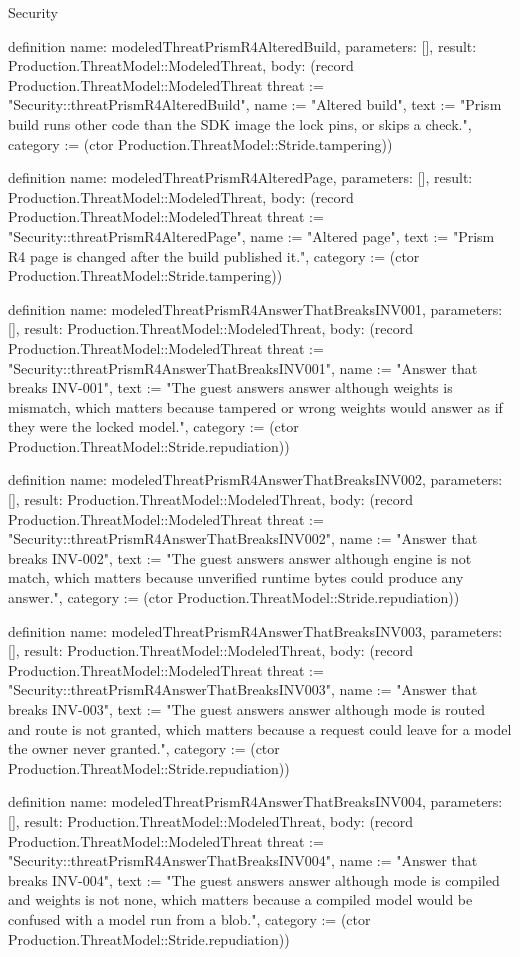 \begin{lexlean}{Security}
\begin{semanticmodule}
definition{
  name: modeledThreatPrismR4AlteredBuild,
  parameters: [],
  result: Production.ThreatModel::ModeledThreat,
  body: (record Production.ThreatModel::ModeledThreat {threat := "Security::threatPrismR4AlteredBuild", name := "Altered build", text := "Prism build runs other code than the SDK image the lock pins, or skips a check.", category := (ctor Production.ThreatModel::Stride.tampering)})
}

definition{
  name: modeledThreatPrismR4AlteredPage,
  parameters: [],
  result: Production.ThreatModel::ModeledThreat,
  body: (record Production.ThreatModel::ModeledThreat {threat := "Security::threatPrismR4AlteredPage", name := "Altered page", text := "Prism R4 page is changed after the build published it.", category := (ctor Production.ThreatModel::Stride.tampering)})
}

definition{
  name: modeledThreatPrismR4AnswerThatBreaksINV001,
  parameters: [],
  result: Production.ThreatModel::ModeledThreat,
  body: (record Production.ThreatModel::ModeledThreat {threat := "Security::threatPrismR4AnswerThatBreaksINV001", name := "Answer that breaks INV-001", text := "The guest answers answer although weights is mismatch, which matters because tampered or wrong weights would answer as if they were the locked model.", category := (ctor Production.ThreatModel::Stride.repudiation)})
}

definition{
  name: modeledThreatPrismR4AnswerThatBreaksINV002,
  parameters: [],
  result: Production.ThreatModel::ModeledThreat,
  body: (record Production.ThreatModel::ModeledThreat {threat := "Security::threatPrismR4AnswerThatBreaksINV002", name := "Answer that breaks INV-002", text := "The guest answers answer although engine is not match, which matters because unverified runtime bytes could produce any answer.", category := (ctor Production.ThreatModel::Stride.repudiation)})
}

definition{
  name: modeledThreatPrismR4AnswerThatBreaksINV003,
  parameters: [],
  result: Production.ThreatModel::ModeledThreat,
  body: (record Production.ThreatModel::ModeledThreat {threat := "Security::threatPrismR4AnswerThatBreaksINV003", name := "Answer that breaks INV-003", text := "The guest answers answer although mode is routed and route is not granted, which matters because a request could leave for a model the owner never granted.", category := (ctor Production.ThreatModel::Stride.repudiation)})
}

definition{
  name: modeledThreatPrismR4AnswerThatBreaksINV004,
  parameters: [],
  result: Production.ThreatModel::ModeledThreat,
  body: (record Production.ThreatModel::ModeledThreat {threat := "Security::threatPrismR4AnswerThatBreaksINV004", name := "Answer that breaks INV-004", text := "The guest answers answer although mode is compiled and weights is not none, which matters because a compiled model would be confused with a model run from a blob.", category := (ctor Production.ThreatModel::Stride.repudiation)})
}


\end{semanticmodule}
\end{lexlean}

